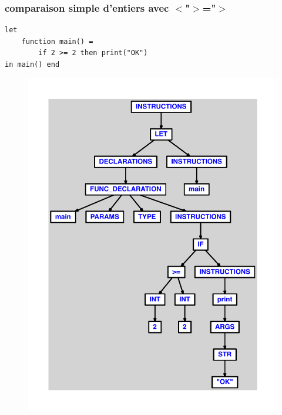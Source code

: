 \documentclass{article}
\begin{document}
\subsubsection{comparaison simple d'entiers avec $ < $"$ > $="$ > $}
\begin{lstlisting}
let
	function main() =
		if 2 >= 2 then print("OK")
in main() end
\end{lstlisting}
\newpage
\begin{figure}[H]
\centering
\includegraphics[max width=\textwidth]{ast/ast_170.pdf}
\end{figure}
\newpage
\end{document}
